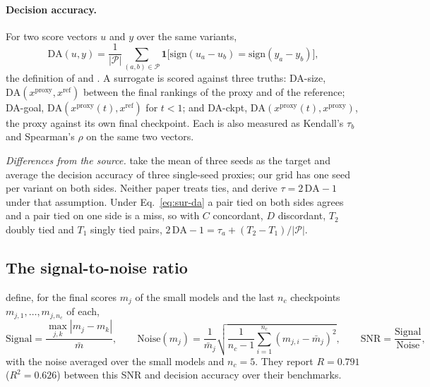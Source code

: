 \paragraph{Decision accuracy.} For two score vectors $u$ and $y$ over the same variants,
\begin{equation}
\mathrm{DA}(u, y) = \frac{1}{|\mathcal{P}|} \sum_{(a,b) \in \mathcal{P}} \mathbf{1}\big[\mathrm{sign}(u_a - u_b) = \mathrm{sign}(y_a - y_b)\big],
\label{eq:sur-da}
\end{equation}
the definition of \citet{magnusson_datadecide_2025} and \citet{heineman_signal_2025}.
A surrogate is scored against three truths: DA-size, $\mathrm{DA}(x^{\text{proxy}}, x^{\text{ref}})$ between the final rankings of the proxy and of the reference; DA-goal, $\mathrm{DA}(x^{\text{proxy}}(t), x^{\text{ref}})$ for $t < 1$; and DA-ckpt, $\mathrm{DA}(x^{\text{proxy}}(t), x^{\text{proxy}})$, the proxy against its own final checkpoint.
Each is also measured as Kendall's $\tau_b$ and Spearman's $\rho$ on the same two vectors.

\emph{Differences from the source.}
\citet{magnusson_datadecide_2025} take the mean of three seeds as the target and average the decision accuracy of three single-seed proxies; our grid has one seed per variant on both sides.
Neither paper treats ties, and \citet{heineman_signal_2025} derive $\tau = 2\,\mathrm{DA} - 1$ under that assumption.
Under Eq.~\ref{eq:sur-da} a pair tied on both sides agrees and a pair tied on one side is a miss, so with $C$ concordant, $D$ discordant, $T_2$ doubly tied and $T_1$ singly tied pairs, $2\,\mathrm{DA} - 1 = \tau_a + (T_2 - T_1)/|\mathcal{P}|$.

\subsection{The signal-to-noise ratio}
\label{app:sur-snr}

\citet{heineman_signal_2025} define, for the final scores $m_j$ of the small models and the last $n_c$ checkpoints $m_{j,1},\dots,m_{j,n_c}$ of each,
\begin{equation}
\text{Signal} = \frac{\max_{j,k} |m_j - m_k|}{\bar{m}}, \qquad
\text{Noise}(m_j) = \frac{1}{\bar{m}_j}\sqrt{\frac{1}{n_c - 1}\sum_{i=1}^{n_c}(m_{j,i} - \bar{m}_j)^2}, \qquad
\mathrm{SNR} = \frac{\text{Signal}}{\text{Noise}},
\label{eq:sur-snr-paper}
\end{equation}
with the noise averaged over the small models and $n_c = 5$.
They report $R = 0.791$ ($R^2 = 0.626$) between this SNR and decision accuracy over their benchmarks.

